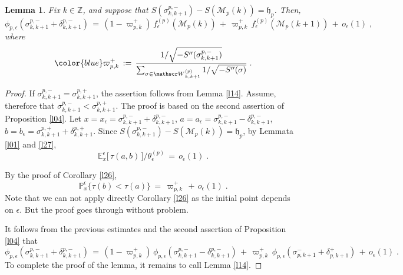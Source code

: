 \documentclass[reqno]{amsart}
\theoremstyle{plain}
\newtheorem{lemma}[theorem]{Lemma}
\theoremstyle{definition}
\newcommand{\mf}[1]{{\mathfrak #1}}
\newcommand{\bb}[1]{{\mathbb #1}}
\newcommand{\ms}[1]{{\mathscr #1}}
\newcounter{as}[section]
\newcommand{\<}{\langle}
\renewcommand{\>}{\rangle}
\begin{document}
\begin{lemma}
\label{l28}
Fix $k\in \bb Z$, and suppose that
$S(\sigma^{p,-}_{k,k+1}) - S(\ms M_p(k)) = \mf h_p$. Then,
\begin{equation*}
\phi_{p,\epsilon}(\sigma^{p,-}_{k,k+1} + \delta^{p,-}_{k,k+1}) \,=\,
(1-\varpi^{+}_{p,k} )\, f^{(p)}_\epsilon (\ms M_p(k)) 
\,+\, \varpi^{+}_{p,k} \,   f^{(p)}_\epsilon (\ms M_{p}(k+1)) 
\,+\,o_\epsilon(1)\;,
\end{equation*}
where
\begin{equation*}
{\color{blue} \varpi^{+}_{p,k} }  \,:=\, \frac{1/\sqrt{- S''(\sigma^{p,-}_{k,k+1})}}
{\sum_{\sigma \in \ms W^{(p)}_{k,k+1}} 1/\sqrt{- S''(\sigma)}}  \;.
\end{equation*}
\end{lemma}

\begin{proof}
If $\sigma^{p,-}_{k,k+1} = \sigma^{p,+}_{k,k+1}$, the assertion
follows from Lemma \ref{l14}.  Assume, therefore that
$\sigma^{p,-}_{k,k+1} < \sigma^{p,+}_{k,k+1}$.  The proof is based on
the second assertion of Proposition \ref{l04}.  Let
$x=x_\epsilon = \sigma^{p,-}_{k,k+1} + \delta^{p,-}_{k,k+1}$,
$a=a_\epsilon = \sigma^{p,-}_{k,k+1} - \delta^{p,-}_{k,k+1}$,
$b=b_\epsilon = \sigma^{p,+}_{k,k+1} + \delta^{p,+}_{k,k+1}$. Since
$S(\sigma^{p,-}_{k,k+1}) - S(\ms M_p(k)) = \mf h_p$, by Lemmata
\ref{l01} and \ref{l27},
\begin{equation*}
\bb E^\epsilon_{x}\big[\, \tau(a,b)\, \big] / \theta^{(p)}_\epsilon
\, =\, o_\epsilon(1)\;.
\end{equation*}

By the proof of Corollary \ref{l26},
\begin{equation*}
\bb P^\epsilon_{x}\{\tau(b)< \tau(a)\} \,=\,
\varpi^{+}_{p,k} \,+\, o_\epsilon (1)\;.
\end{equation*}
Note that we can not apply directly Corollary \ref{l26} as the initial
point depends on $\epsilon$. But the proof goes through without
problem. 

It follows from the previous estimates and the second
assertion of Proposition \ref{l04} that
\begin{equation*}
\phi_{p,\epsilon}(\sigma^{p,-}_{k,k+1} + \delta^{p,-}_{k,k+1}) \,=\,
(1-\varpi^{+}_{p,k})\, \phi_{p,\epsilon}(\sigma^{p,-}_{k,k+1} - \delta^{p,-}_{k,k+1}) 
\,+\, \varpi^{+}_{p,k} \,  \phi_{p,\epsilon}(\sigma^{-}_{p,k+1} + \delta^{+}_{p,k+1})  
\,+\,o_\epsilon(1)\;.
\end{equation*}
To complete the proof of the lemma, it remains to call Lemma \ref{l14}.
\end{proof}
\end{document}

